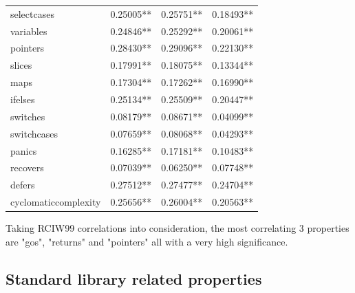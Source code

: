 \documentclass{seal_thesis}
\begin{document}
\begin{table}[H]
\begin{tabular}{@{}llll@{}}
		selectcases & \cellcolor[HTML]{C0C0C0}0.25005** & \cellcolor[HTML]{FFCC99}0.25751** & \cellcolor[HTML]{99CCFF}0.18493** \\
		variables & \cellcolor[HTML]{C0C0C0}0.24846** & \cellcolor[HTML]{C0C0C0}0.25292** & \cellcolor[HTML]{99CCFF}0.20061** \\
		pointers & \cellcolor[HTML]{FFCC99}0.28430** & \cellcolor[HTML]{FFCC99}0.29096** & \cellcolor[HTML]{C0C0C0}0.22130** \\
		slices & \cellcolor[HTML]{99CCFF}0.17991** & \cellcolor[HTML]{99CCFF}0.18075** & \cellcolor[HTML]{99CCFF}0.13344** \\
		maps & \cellcolor[HTML]{99CCFF}0.17304** & \cellcolor[HTML]{99CCFF}0.17262** & \cellcolor[HTML]{99CCFF}0.16990** \\
		ifelses & \cellcolor[HTML]{C0C0C0}0.25134** & \cellcolor[HTML]{FFCC99}0.25509** & \cellcolor[HTML]{99CCFF}0.20447** \\
		switches & \cellcolor[HTML]{99CCFF}0.08179** & \cellcolor[HTML]{99CCFF}0.08671** & \cellcolor[HTML]{3366FF}0.04099** \\
		switchcases & \cellcolor[HTML]{99CCFF}0.07659** & \cellcolor[HTML]{99CCFF}0.08068** & \cellcolor[HTML]{3366FF}0.04293** \\
		panics & \cellcolor[HTML]{99CCFF}0.16285** & \cellcolor[HTML]{99CCFF}0.17181** & \cellcolor[HTML]{99CCFF}0.10483** \\
		recovers & \cellcolor[HTML]{3366FF}0.07039** & \cellcolor[HTML]{3366FF}0.06250** & \cellcolor[HTML]{99CCFF}0.07748** \\
		defers & \cellcolor[HTML]{FFCC99}0.27512** & \cellcolor[HTML]{FFCC99}0.27477** & \cellcolor[HTML]{C0C0C0}0.24704** \\
		cyclomaticcomplexity & \cellcolor[HTML]{FFCC99}0.25656** & \cellcolor[HTML]{FFCC99}0.26004** & \cellcolor[HTML]{99CCFF}0.20563** \\
		\bottomrule
	\end{tabular}
\end{table}

Taking RCIW99 correlations into consideration, the most correlating 3 properties are "gos", "returns" and "pointers" all with a very high significance. 

\subsection{Standard library related properties}
\label{Standard library related properties}
\end{document}
